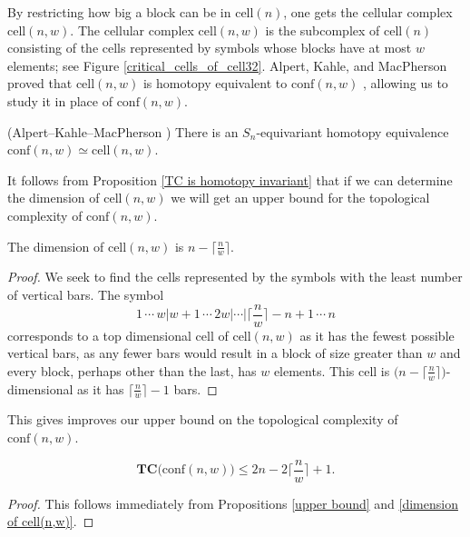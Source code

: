 By restricting how big a block can be in $\text{cell}(n)$, one gets the cellular complex $\text{cell}(n,w)$.
The cellular complex \emph{$\text{cell}(n,w)$} is the subcomplex of $\text{cell}(n)$ consisting of the cells represented by symbols whose blocks have at most $w$ elements; see Figure \ref{critical_cells_of_cell32}.
Alpert, Kahle, and MacPherson proved that $\text{cell}(n,w)$ is homotopy equivalent to $\text{conf}(n,w)$ \cite[Theorem 3.1]{alpert2021configuration}, allowing us to study it in place of $\text{conf}(n,w)$.

\begin{prop}
(Alpert--Kahle--MacPherson \cite[Theorem 3.1]{alpert2021configuration}) There is an $S_{n}$-equivariant homotopy equivalence $\text{conf}(n,w)\simeq \text{cell}(n,w)$.
\end{prop}

It follows from Proposition \ref{TC is homotopy invariant} that if we can determine the dimension of $\text{cell}(n,w)$ we will get an upper bound for the topological complexity of $\text{conf}(n,w)$.

\begin{prop}\label{dimension of cell(n,w)}
The dimension of $\text{cell}(n,w)$ is $n-\big\lceil\frac{n}{w}\big\rceil$.
\end{prop}

\begin{proof}
We seek to find the cells represented by the symbols with the least number of vertical bars.
The symbol 
\[
1\,\cdots\, w \Big| w+1\, \cdots\, 2w \Big|\cdots\Big| \Big\lceil\frac{n}{w}\Big\rceil-n+1\,\cdots\, n
\]
corresponds to a top dimensional cell of $\text{cell}(n,w)$ as it has the fewest possible vertical bars, as any fewer bars would result in a block of size greater than $w$ and every block, perhaps other than the last, has $w$ elements.
This cell is $\big(n-\big\lceil\frac{n}{w}\big\rceil\big)$-dimensional as it has $\big\lceil\frac{n}{w}\big\rceil-1$ bars.
\end{proof}

This gives improves our upper bound on the topological complexity of $\text{conf}(n,w)$.

\begin{prop}\label{upper bound for top complex of conf(n,w)}
\[
\textbf{TC}\big(\text{conf}(n,w)\big)\le 2n-2\Big\lceil\frac{n}{w}\Big\rceil+1.
\]
\end{prop}

\begin{proof}
This follows immediately from Propositions \ref{upper bound} and \ref{dimension of cell(n,w)}.
\end{proof}

